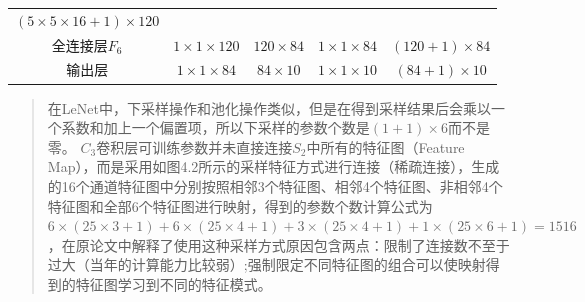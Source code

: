 \begin{longtable}[]{ ccccc }
\begin{minipage}[t]{0.24\columnwidth}
\((5\times5\times16+1)\times120\)\strut
\end{minipage}\tabularnewline
\begin{minipage}[t]{0.12\columnwidth}\centering\strut
全连接层\(F_6\)\strut
\end{minipage} & \begin{minipage}[t]{0.16\columnwidth}\centering\strut
\(1\times1\times120\)\strut
\end{minipage} & \begin{minipage}[t]{0.19\columnwidth}\centering\strut
\(120\times84\)\strut
\end{minipage} & \begin{minipage}[t]{0.16\columnwidth}\centering\strut
\(1\times1\times84\)\strut
\end{minipage} & \begin{minipage}[t]{0.24\columnwidth}\centering\strut
\((120+1)\times84\)\strut
\end{minipage}\tabularnewline
\begin{minipage}[t]{0.12\columnwidth}\centering\strut
输出层\strut
\end{minipage} & \begin{minipage}[t]{0.16\columnwidth}\centering\strut
\(1\times1\times84\)\strut
\end{minipage} & \begin{minipage}[t]{0.19\columnwidth}\centering\strut
\(84\times10\)\strut
\end{minipage} & \begin{minipage}[t]{0.16\columnwidth}\centering\strut
\(1\times1\times10\)\strut
\end{minipage} & \begin{minipage}[t]{0.24\columnwidth}\centering\strut
\((84+1)\times10\)\strut
\end{minipage}\tabularnewline
\bottomrule
\end{longtable}

\begin{quote}
在LeNet中，下采样操作和池化操作类似，但是在得到采样结果后会乘以一个系数和加上一个偏置项，所以下采样的参数个数是\((1+1)\times6​\)而不是零。
\(C_3\)卷积层可训练参数并未直接连接\(S_2\)中所有的特征图（Feature Map），而是采用如图4.2所示的采样特征方式进行连接（稀疏连接），生成的16个通道特征图中分别按照相邻3个特征图、相邻4个特征图、非相邻4个特征图和全部6个特征图进行映射，得到的参数个数计算公式为\(6\times(25\times3+1)+6\times(25\times4+1)+3\times(25\times4+1)+1\times(25\times6+1)=1516\)，在原论文中解释了使用这种采样方式原因包含两点：限制了连接数不至于过大（当年的计算能力比较弱）;强制限定不同特征图的组合可以使映射得到的特征图学习到不同的特征模式。
\end{quote}

